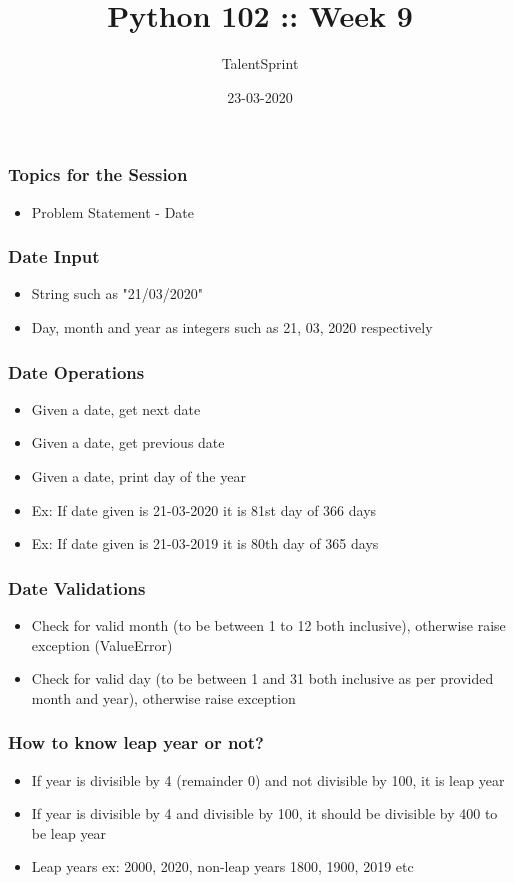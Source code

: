 \documentclass[14pt]{beamer}
\title{Python 102 :: Week 9}
\date{23-03-2020}
\author[TS]{TalentSprint}
\begin{document}
    \begin{frame}
        \titlepage
    \end{frame}
    \begin{frame}
        \frametitle{Topics for the Session}
        \begin{itemize}
            \item Problem Statement - Date
        \end{itemize}
    \end{frame}

    \begin{frame}[containsverbatim]
        \frametitle{Date Input}
        \begin{itemize}
        \item String such as "21/03/2020"
        \item Day, month and year as integers such as 21, 03, 2020 respectively
        \end{itemize}
    \end{frame}

    \begin{frame}[containsverbatim]
        \frametitle{Date Operations}
        \begin{itemize}
        \item Given a date, get next date
        \item Given a date, get previous date
        \item Given a date, print day of the year
        \item Ex: If date given is 21-03-2020 it is 81st day of 366 days
        \item Ex: If date given is 21-03-2019 it is 80th day of 365 days
        \end{itemize}
    \end{frame}

    \begin{frame}[containsverbatim]
        \frametitle{Date Validations}
        \begin{itemize}
        \item Check for valid month (to be between 1 to 12 both inclusive), otherwise raise exception (ValueError)
        \item Check for valid day (to be between 1 and 31 both inclusive as per provided month and year), otherwise raise exception
        \end{itemize}
    \end{frame}

    \begin{frame}[containsverbatim]
        \frametitle{How to know leap year or not?}
        \begin{itemize}
        \item If year is divisible by 4 (remainder 0) and not divisible by 100, it is leap year
        \item If year is divisible by 4 and divisible by 100, it should be divisible by 400 to be leap year
        \item Leap years ex: 2000, 2020, non-leap years 1800, 1900, 2019 etc
        \end{itemize}
    \end{frame}
\end{document}
